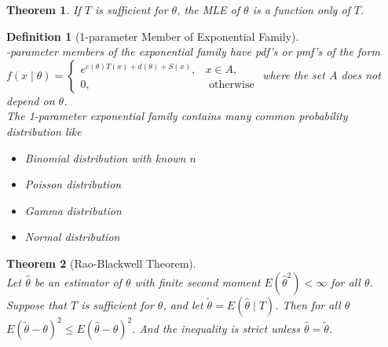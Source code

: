 \documentclass[12pt]{article}
\newtheorem{definition}{Definition}[section]
\newtheorem{theorem}{Theorem}[section]
\theoremstyle{definition}
\begin{document}
\begin{theorem}\normalfont If $T$ is sufficient for $\theta$, the MLE of $\theta$ is a function only of $T$.
\end{theorem}
\begin{definition}[1-parameter Member of Exponential Family]
\hfill\\-parameter members of the exponential family have pdf's or pmf's of the form
$
f(x\mid \theta)=\begin{cases}
e^{c(\theta)T(x)+d(\theta)+S(x)},&x\in A,\\
0, &\text{ otherwise} 
\end{cases}
$
where the set $A$ does not depend on $\theta$.\\
The 1-parameter exponential family contains many common probability distribution like
\begin{itemize}
  \item Binomial distribution with known $n$
  \item Poisson distribution
  \item Gamma distribution
  \item Normal distribution
\end{itemize}
\end{definition}
\begin{theorem}[Rao-Blackwell Theorem]
\hfill\\\normalfont Let $\hat{\theta}$ be an estimator of $\theta$ with finite second moment $E(\hat{\theta}^2)<\infty$ for all $\theta$. Suppose that $T$ is sufficient for $\theta$, and let $\tilde{\theta} = E(\hat{\theta}\mid T)$. Then for all $\theta$
$
E(\tilde{\theta}-\theta)^2\leq E(\hat{\theta}-\theta)^2.
$
And the inequality is strict unless $\hat{\theta}=\tilde{\theta}$.
\end{theorem}
\end{document}

